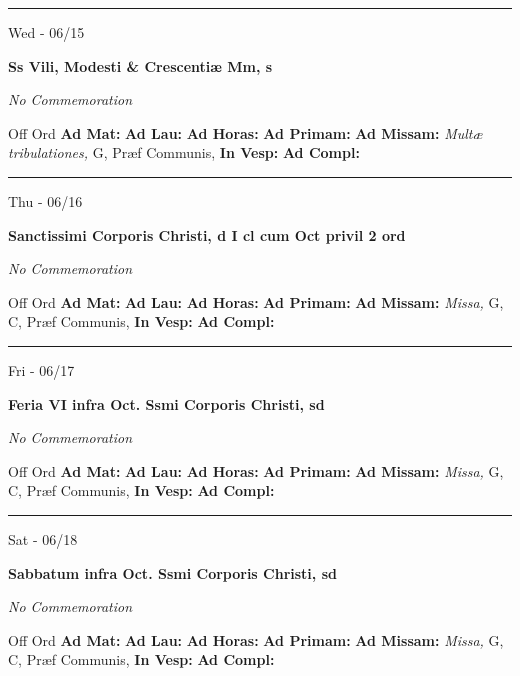 \documentclass[letterpaper, 10pt]{article}
\begin{document}
\hrule
\begin{center}
Wed - 06/15
\end{center}\textbf{ \large Ss Vili, Modesti \& Crescentiæ Mm, \textnormal{\normalsize s}}

\textit{No Commemoration}\begin{justify}
Off Ord
\textbf{Ad Mat: }
\textbf{Ad Lau: }
\textbf{Ad Horas: }
\textbf{Ad Primam: }
\textbf{Ad Missam:} \textit{Multæ tribulationes, } G, Præf Communis, 
\textbf{In Vesp: }
\textbf{Ad Compl: }\end{justify}



\hrule
\begin{center}
Thu - 06/16
\end{center}\textbf{ \large Sanctissimi Corporis Christi, \textnormal{\normalsize d I cl cum Oct privil 2 ord}}

\textit{No Commemoration}\begin{justify}
Off Ord
\textbf{Ad Mat: }
\textbf{Ad Lau: }
\textbf{Ad Horas: }
\textbf{Ad Primam: }
\textbf{Ad Missam:} \textit{Missa, } G, C, Præf Communis, 
\textbf{In Vesp: }
\textbf{Ad Compl: }\end{justify}



\hrule
\begin{center}
Fri - 06/17
\end{center}\textbf{ \large Feria VI infra Oct. Ssmi Corporis Christi, \textnormal{\normalsize sd}}

\textit{No Commemoration}\begin{justify}
Off Ord
\textbf{Ad Mat: }
\textbf{Ad Lau: }
\textbf{Ad Horas: }
\textbf{Ad Primam: }
\textbf{Ad Missam:} \textit{Missa, } G, C, Præf Communis, 
\textbf{In Vesp: }
\textbf{Ad Compl: }\end{justify}



\hrule
\begin{center}
Sat - 06/18
\end{center}\textbf{ \large Sabbatum infra Oct. Ssmi Corporis Christi, \textnormal{\normalsize sd}}

\textit{No Commemoration}\begin{justify}
Off Ord
\textbf{Ad Mat: }
\textbf{Ad Lau: }
\textbf{Ad Horas: }
\textbf{Ad Primam: }
\textbf{Ad Missam:} \textit{Missa, } G, C, Præf Communis, 
\textbf{In Vesp: }
\textbf{Ad Compl: }\end{justify}
\end{document}
